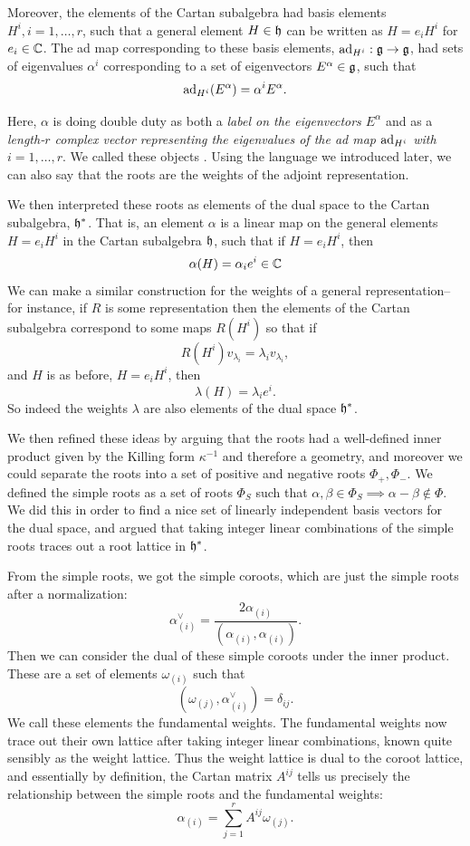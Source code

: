 Moreover, the elements of the Cartan subalgebra had basis elements $H^i, i=1,\ldots,r$, such that a general element $H\in \mathfrak{h}$ can be written as $H=e_i H^i$ for $e_i\in \mathbb{C}$. The ad map corresponding to these basis elements, $\operatorname{ad}_{H^i}: \mathfrak{g}\to \mathfrak{g}$, had sets of eigenvalues $\alpha^i$ corresponding to a set of eigenvectors $E^\alpha \in \mathfrak{g}$, such that
$$\operatorname{ad}_{H^i}(E^\alpha)=\alpha^i E^\alpha.$$ 

Here, $\alpha$ is doing double duty as both a \emph{label on the eigenvectors $E^\alpha$} and as a \emph{length-$r$ complex vector representing the eigenvalues of the ad map $\operatorname{ad}_{H^i}$ with $i=1,\ldots,r$}. We called these objects . Using the language we introduced later, we can also say that the roots are the weights of the adjoint representation. 

We then interpreted these roots as elements of the dual space to the Cartan subalgebra, $\mathfrak{h}^*$. That is, an element $\alpha$ is a linear map on the general elements $H=e_i H^i$ in the Cartan subalgebra $\mathfrak{h}$, such that if $H=e_i H^i$, then $$\alpha(H)=\alpha_i e^i \in \mathbb{C}$$ We can make a similar construction for the weights of a general representation-- for instance, if $R$ is some representation then the elements of the Cartan subalgebra correspond to some maps $R(H^i)$ so that if
$$R(H^i)v_{\lambda_i}=\lambda_i v_{\lambda_i},$$
and $H$ is as before, $H=e_i H^i$, then $$\lambda(H)=\lambda_i e^i.$$
So indeed the weights $\lambda$ are also elements of the dual space $\mathfrak{h}^*$.

We then refined these ideas by arguing that the roots had a well-defined inner product given by the Killing form $\kappa^{-1}$ and therefore a geometry, and moreover we could separate the roots into a set of positive and negative roots $\Phi_+,\Phi_-$. We defined the simple roots as a set of roots $\Phi_S$ such that $\alpha,\beta\in \Phi_S\implies \alpha-\beta \notin \Phi$. We did this in order to find a nice set of linearly independent basis vectors for the dual space, and argued that taking integer linear combinations of the simple roots traces out a root lattice in $\mathfrak{h}^*$.

From the simple roots, we got the simple coroots, which are just the simple roots after a normalization:
$$\alpha^\vee_{(i)}=\frac{2\alpha_{(i)}}{(\alpha_{(i)},\alpha_{(i)})}.$$ Then we can consider the dual of these simple coroots under the inner product. These are a set of elements $\omega_{(i)}$ such that
$$(\omega_{(j)},\alpha^\vee_{(i)})=\delta_{ij}.$$ We call these elements the fundamental weights. The fundamental weights now trace out their own lattice after taking integer linear combinations, known quite sensibly as the weight lattice. Thus the weight lattice is dual to the coroot lattice, and essentially by definition, the Cartan matrix $A^{ij}$ tells us precisely the relationship between the simple roots and the fundamental weights:
$$\alpha_{(i)}=\sum_{j=1}^r A^{ij}\omega_{(j)}.$$

